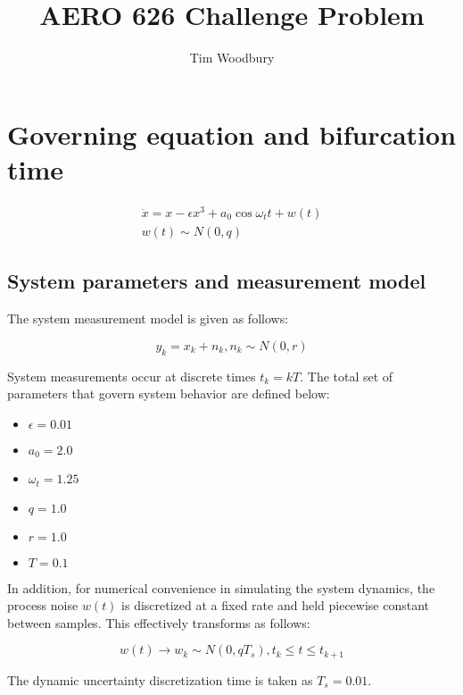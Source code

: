 \documentclass[]{article}
\title{AERO 626 Challenge Problem}
\author{Tim Woodbury}
\begin{document}

\maketitle

\section{Governing equation and bifurcation time}

\begin{align}
\ddot{x} = x - \epsilon x^3 + a_0 \cos{\omega_t t} + w(t) \label{eq:eqom} \\
w(t) \sim N(0,q)
\end{align}

\subsection{System parameters and measurement model}

The system measurement model is given as follows:

\begin{equation}
y_k = x_k + n_k, n_k \sim N(0,r)
\end{equation}

System measurements occur at discrete times $t_k = kT$. The total set of parameters that govern system behavior are defined below:

\begin{itemize}
\item $\epsilon = 0.01$
\item $a_0 = 2.0$
\item $\omega_t = 1.25$
\item $q = 1.0$
\item $r = 1.0$
\item $T = 0.1$
\end{itemize}

In addition, for numerical convenience in simulating the system dynamics, the process noise $w(t)$ is discretized at a fixed rate and held piecewise constant between samples. This effectively transforms as follows:

\begin{equation}
w(t) \rightarrow w_k \sim N(0,qT_s), t_k \leq t \leq t_{k+1}
\end{equation}

The dynamic uncertainty discretization time is taken as $T_s = 0.01$.
\end{document}
